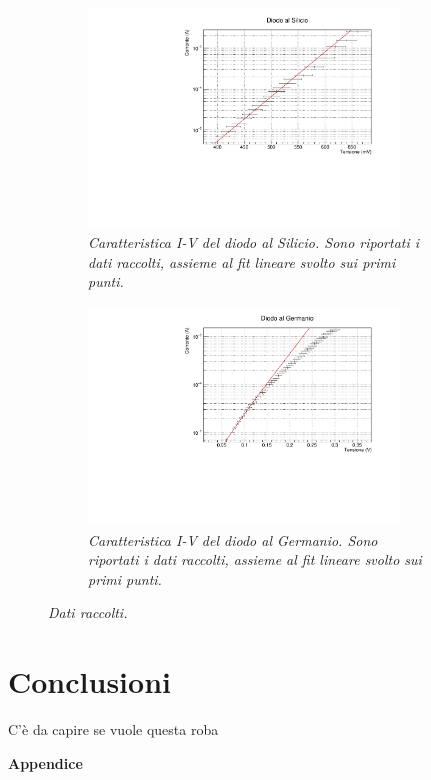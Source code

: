 \documentclass[11pt, a4paper, twocolumn]{article}
\begin{document}
  \begin{figure}%
    \centering
    \begin{subfigure}[t]{.47\textwidth}
      \includegraphics[width=8.25cm]{./assets/1/SilicioBlu.pdf}
      \caption{
        \emph{
          Caratteristica I-V del diodo al Silicio. Sono riportati i dati raccolti, assieme al fit lineare svolto sui primi punti.
        }
      }
      \label{fig:caratteristica-silicio}
    \end{subfigure}
    \hspace{5mm}
    \begin{subfigure}[t]{.47\textwidth}
      \includegraphics[width=8.25cm]{./assets/1/Germanio2.pdf}
      \caption{
        \emph{
           Caratteristica I-V del diodo al Germanio. Sono riportati i dati raccolti, assieme al fit lineare svolto sui primi punti.
        }
      }
      \label{fig:caratteristica-germanio}
    \end{subfigure}
    \caption{\emph{Dati raccolti.}
    \label{fig:caratteristiche-iv}}
  \end{figure}

\section{Conclusioni}\label{sec:conclusioni}
  C'è da capire se vuole questa roba

\newpage
\appendix
\textbf{\huge{Appendice}}
\end{document}
